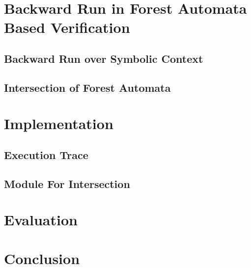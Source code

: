 \chapter{Backward Run in Forest Automata Based Verification}
\label{ch:backward}

\section{Backward Run over Symbolic Context}

\section{Intersection of Forest Automata}

\chapter{Implementation}
\label{ch:impl}

\section{Execution Trace}
\section{Module For Intersection}

\chapter{Evaluation}
\label{ch:eval}

\chapter{Conclusion}
\label{ch:concl}
